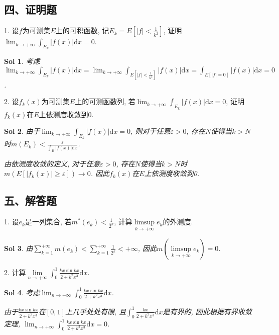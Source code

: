 \documentclass[UTF8]{article}
\newtheorem{solution}{Sol}
\begin{document}
  \subsection*{四、证明题}

  1. 设$f$为可测集$E$上的可积函数, 记$E_k=E\left[|f|<\frac{1}{k^2}\right]$, 证明$\lim_{k \to +\infty}\int_{E_k}|f(x)|\mathrm{d}x=0$.\par

  \begin{solution}
    考虑$\lim_{k \to +\infty}\int_{E_k}|f(x)|\mathrm{d}x=\lim_{k \to +\infty}\int_{E\left[|f|<\frac{1}{k^2}\right]}|f(x)|\mathrm{d}x=\int_{E\left[|f|=0\right]}|f(x)|\mathrm{d}x=0$.\par
  \end{solution}

  2. 设$f_k(x)$为可测集$E$上的可测函数列, 若$\lim_{k \to +\infty}\int_{E_k}|f(x)|\mathrm{d}x=0$, 证明$f_k(x)$在$E$上依测度收敛到0.\par

  \begin{solution}
    由于$\lim_{k \to +\infty}\int_{E_k}|f(x)|\mathrm{d}x=0$, 则对于任意$\varepsilon >0$, 存在$N$使得当$k>N$时$m(E_k)<\frac{\varepsilon}{\int_{E}|f(x)|\mathrm{d}x}$.\par
    由依测度收敛的定义, 对于任意$\varepsilon >0$, 存在$N$使得当$k>N$时$m(E\left[|f_k(x)|\geqslant \varepsilon\right])\to 0$. 因此$f_k(x)$在$E$上依测度收敛到0.\par
  \end{solution}

  \subsection*{五、解答题}

  1. 设$e_k$是一列集合, 若$m^{*}(e_k)<\frac{1}{2^k}$, 计算$\limsup \limits_{k \to +\infty}e_k$的外测度.\par

  \begin{solution}
    由$\sum_{k=1}^{+\infty}m(e_k)<\sum_{k=1}^{+\infty}\frac{1}{2^k}<+\infty$, 因此$m(\limsup \limits_{k \to +\infty}e_k)=0$.\par
  \end{solution}

  2. 计算$\lim \limits_{n \to +\infty}\int_{0}^{1}\frac{kx \sin{kx}}{2+k^2x^3}\mathrm{d}x$.\par

  \begin{solution}
    考虑$\lim_{n \to +\infty}\int_{0}^{1}\frac{kx \sin{kx}}{2+k^2x^3}\mathrm{d}x$.\par
    由于$\frac{kx \sin{kx}}{2+k^2x^3}$在$[0,1]$上几乎处处有限, 且$\int_{0}^{1}\frac{kx}{2+k^2x^3}\mathrm{d}x$是有界的, 因此根据有界收敛定理, $\lim_{n \to +\infty}\int_{0}^{1}\frac{kx \sin{kx}}{2+k^2x^3}\mathrm{d}x=0$.\par
  \end{solution}
\end{document}
